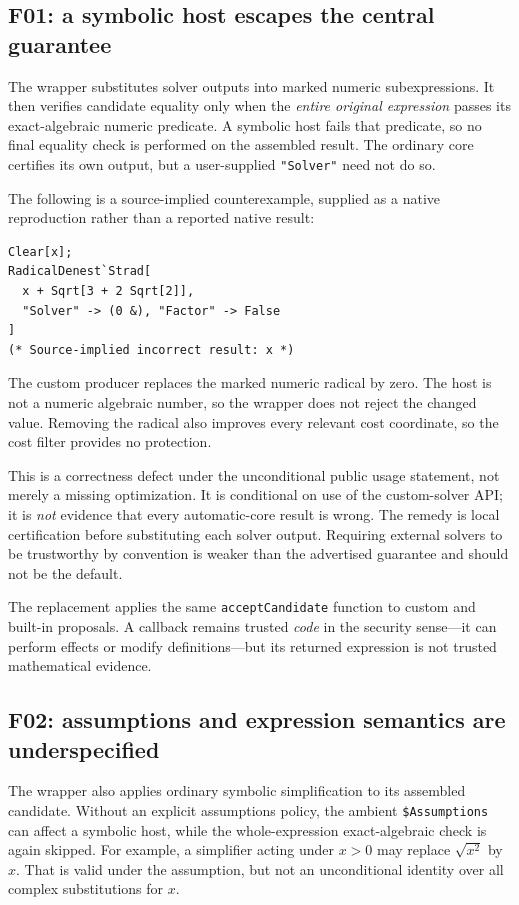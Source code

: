 \documentclass[11pt,letterpaper]{article}
\newcommand{\code}[1]{\texttt{#1}}
\theoremstyle{definition}
\begin{document}
\subsection{F01: a symbolic host escapes the central guarantee}

The wrapper substitutes solver outputs into marked numeric subexpressions. It then verifies candidate equality only when the \emph{entire original expression} passes its exact-algebraic numeric predicate. A symbolic host fails that predicate, so no final equality check is performed on the assembled result. The ordinary core certifies its own output, but a user-supplied \code{"Solver"} need not do so.\cite{fixed}

The following is a source-implied counterexample, supplied as a native reproduction rather than a reported native result:
\begin{lstlisting}
Clear[x];
RadicalDenest`Strad[
  x + Sqrt[3 + 2 Sqrt[2]],
  "Solver" -> (0 &), "Factor" -> False
]
(* Source-implied incorrect result: x *)
\end{lstlisting}
The custom producer replaces the marked numeric radical by zero. The host is not a numeric algebraic number, so the wrapper does not reject the changed value. Removing the radical also improves every relevant cost coordinate, so the cost filter provides no protection.

This is a correctness defect under the unconditional public usage statement, not merely a missing optimization. It is conditional on use of the custom-solver API; it is \emph{not} evidence that every automatic-core result is wrong. The remedy is local certification before substituting each solver output. Requiring external solvers to be trustworthy by convention is weaker than the advertised guarantee and should not be the default.

The replacement applies the same \code{acceptCandidate} function to custom and built-in proposals. A callback remains trusted \emph{code} in the security sense---it can perform effects or modify definitions---but its returned expression is not trusted mathematical evidence.

\subsection{F02: assumptions and expression semantics are underspecified}

The wrapper also applies ordinary symbolic simplification to its assembled candidate. Without an explicit assumptions policy, the ambient \code{\$Assumptions} can affect a symbolic host, while the whole-expression exact-algebraic check is again skipped. For example, a simplifier acting under $x>0$ may replace $\sqrt{x^2}$ by $x$. That is valid under the assumption, but not an unconditional identity over all complex substitutions for $x$.
\end{document}
